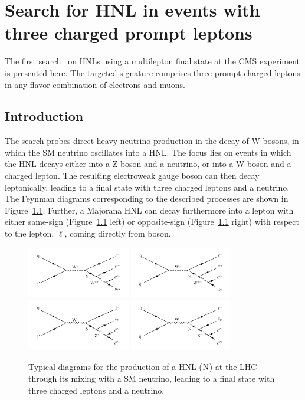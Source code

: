 \chapter{Search for HNL in events with three charged prompt
  leptons} \label{Chapter5}

The first search~\cite{Sirunyan:2018mtv} on HNLs using a multilepton
final state at the CMS
experiment is presented here. The targeted signature comprises 
three prompt charged leptons in any flavor combination of electrons
and muons. 

\section{Introduction}
The search probes direct heavy neutrino production in the decay of W
bosons, in which the SM neutrino oscillates into a HNL. The focus
lies on events in which the HNL decays either into a Z boson and a
neutrino, or into a W boson and a charged lepton. The resulting
electroweak gauge boson can then decay leptonically, leading to a
final state with three charged leptons and a neutrino. The Feynman diagrams corresponding to the described processes are shown in 
Figure~\ref{fig:c5hnldiagram}. Further, a Majorana HNL can decay
furthermore into a lepton with either same-sign (Figure~\ref{fig:c5hnldiagram} left) 
or opposite-sign (Figure~\ref{fig:c5hnldiagram} right) with respect to the lepton, $\ell$, coming directly from \PW boson. 
\begin{figure}[h]
\centering
\includegraphics[width=0.4\textwidth]{Figures/c5/hnl_feyn.pdf}
\includegraphics[width=0.4\textwidth]{Figures/c5/hnl_feyn_2.pdf}\\
\includegraphics[width=0.4\textwidth]{Figures/c5/hnl_z_feyn.pdf}
\includegraphics[width=0.4\textwidth]{Figures/c5/hnl_z_feyn_2.pdf}
\caption{Typical diagrams for the production of a HNL ($\mathrm{N}$)  at the LHC \ti
through its mixing with a SM neutrino, leading to a
final state with three charged leptons and a neutrino.}
\label{fig:c5hnldiagram}
\end{figure}

